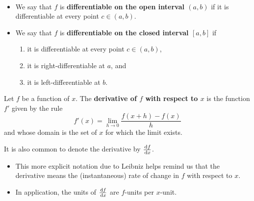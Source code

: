 \begin{definition}\,
\begin{itemize}
\item We say that $f$ is \textbf{differentiable on the open interval $(a,b)$} if it is differentiable at every point $c\in (a,b)$.
\item We say that $f$ is \textbf{differentiable on the closed interval $[a,b]$} if
\begin{enumerate}
\item it is differentiable at every point $c\in (a,b)$,
\item it is right-differentiable at $a$, and
\item it is left-differentiable at $b$.
\end{enumerate}
\end{itemize}
\end{definition}

%



\newpage

\begin{definition}
Let $f$ be a function of $x$.
The \textbf{derivative of $f$ with respect to $x$} is the function $f'$ given by the rule
\begin{equation*}
f'(x) = \lim_{h\to 0}\frac{f(x+h) - f(x)}{h}
\end{equation*}
and whose domain is the set of $x$ for which the limit exists.
\end{definition}
\begin{remark}
It is also common to denote the derivative by $\frac{\mkern 2mu \mathrm{d} f}{\mkern 2mu \mathrm{d} x}$.
\begin{itemize}
\item This more explicit notation due to Leibniz helps remind us that the derivative means the (instantaneous) rate of change in $f$ with respect to $x$.
\item In application, the units of $\frac{\mkern 2mu \mathrm{d} f}{\mkern 2mu \mathrm{d} x}$ are $f$-units per $x$-unit.
\end{itemize}
\end{remark}

